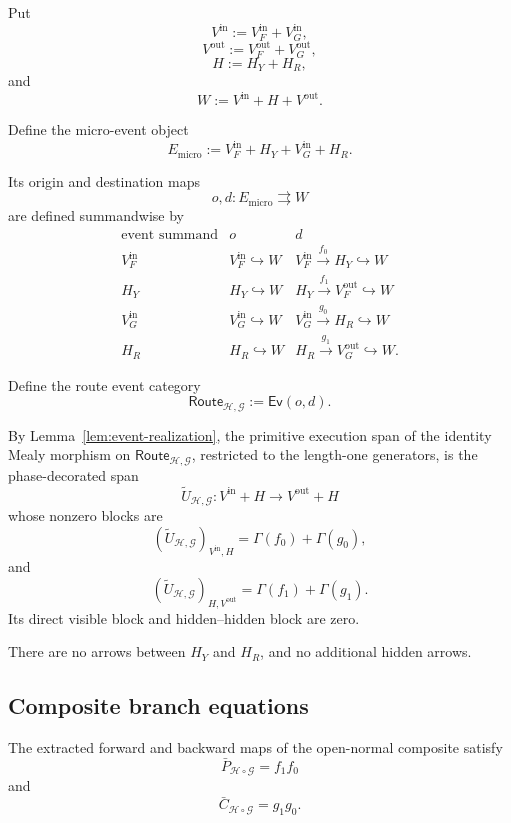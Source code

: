 Put
\[
  V^{\mathrm{in}}
  :=
  V_F^{\mathrm{in}}
  +
  V_G^{\mathrm{in}},
\]
\[
  V^{\mathrm{out}}
  :=
  V_F^{\mathrm{out}}
  +
  V_G^{\mathrm{out}},
\]
\[
  H:=H_Y+H_R,
\]
and
\[
  W:=V^{\mathrm{in}}+H+V^{\mathrm{out}}.
\]

Define the micro-event object
\[
  E_{\mathrm{micro}}
  :=
  V_F^{\mathrm{in}}
  +
  H_Y
  +
  V_G^{\mathrm{in}}
  +
  H_R.
\]

Its origin and destination maps
\[
  o,d:E_{\mathrm{micro}}\rightrightarrows W
\]
are defined summandwise by
\[
\begin{array}{c|c|c}
\text{event summand}&o&d\\
\hline
V_F^{\mathrm{in}}
&
V_F^{\mathrm{in}}\hookrightarrow W
&
V_F^{\mathrm{in}}\xrightarrow{f_0}H_Y\hookrightarrow W
\\[1mm]
H_Y
&
H_Y\hookrightarrow W
&
H_Y\xrightarrow{f_1}V_F^{\mathrm{out}}\hookrightarrow W
\\[1mm]
V_G^{\mathrm{in}}
&
V_G^{\mathrm{in}}\hookrightarrow W
&
V_G^{\mathrm{in}}\xrightarrow{g_0}H_R\hookrightarrow W
\\[1mm]
H_R
&
H_R\hookrightarrow W
&
H_R\xrightarrow{g_1}V_G^{\mathrm{out}}\hookrightarrow W.
\end{array}
\]

Define the route event category
\[
  \mathsf{Route}_{\mathcal H,\mathcal G}
  :=
  \mathsf{Ev}(o,d).
\]

By Lemma~\ref{lem:event-realization}, the primitive execution span of the identity Mealy morphism on
\(\mathsf{Route}_{\mathcal H,\mathcal G}\), restricted to the length-one generators, is the
phase-decorated span
\[
  \widetilde U_{\mathcal H,\mathcal G}:
  V^{\mathrm{in}}+H
  \longrightarrow
  V^{\mathrm{out}}+H
\]
whose nonzero blocks are
\[
  (\widetilde U_{\mathcal H,\mathcal G})_{V^{\mathrm{in}},H}
  =
  \Gamma(f_0)+\Gamma(g_0),
\]
and
\[
  (\widetilde U_{\mathcal H,\mathcal G})_{H,V^{\mathrm{out}}}
  =
  \Gamma(f_1)+\Gamma(g_1).
\]
Its direct visible block and hidden--hidden block are zero.

There are no arrows between \(H_Y\) and \(H_R\), and no additional hidden arrows.

\subsection{Composite branch equations}

\begin{lemma}
\label{lem:extracted-composite-branches}
The extracted forward and backward maps of the open-normal composite satisfy
\[
  \bar P_{\mathcal H\circ\mathcal G}
  =
  f_1f_0
\]
and
\[
  \bar C_{\mathcal H\circ\mathcal G}
  =
  g_1g_0.
\]
\end{lemma}

